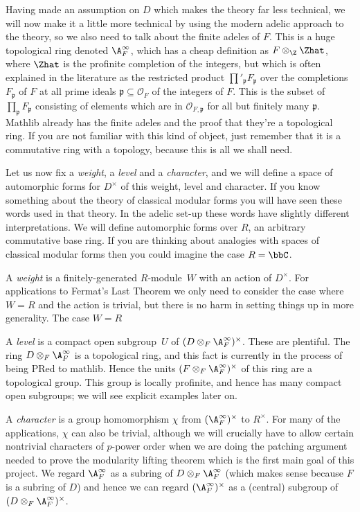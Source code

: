 Having made an assumption on $D$ which makes the theory far less technical, we will now
make it a little more technical by using the modern adelic approach to the theory,
so we also need to talk about the finite adeles of $F$. This is a huge topological ring
denoted $\A_F^\infty$, which has a cheap definition as $F\otimes_{\Z}\Zhat$, where $\Zhat$ is
the profinite completion of the integers, but which is often explained in the literature
as the restricted product $\prod'_{\mathfrak{p}}F_{\mathfrak{p}}$ over the completions
$F_{\mathfrak{p}}$ of $F$ at all prime ideals $\mathfrak{p}\subseteq\mathcal{O}_F$ of the
integers of $F$. This is the subset of $\prod_{\mathfrak{p}}F_{\mathfrak{p}}$ consisting
of elements which are in $\mathcal{O}_{F,\mathfrak{p}}$ for all but finitely many $\mathfrak{p}$.
Mathlib already has the finite adeles and the proof that they're a topological ring. If you are
not familiar with this kind of object, just remember that it is a commutative ring with a topology,
because this is all we shall need.

Let us now fix a \emph{weight}, a \emph{level} and a \emph{character}, and we will define
a space of automorphic forms for $D^\times$ of this weight, level and character. If you know something
about the theory of classical modular forms you will have seen these words used in that theory.
In the adelic set-up these words have slightly different interpretations. We will define automorphic
forms over $R$, an arbitrary commutative base ring. If you are thinking about analogies with
spaces of classical modular forms then you could imagine the case $R=\bbC$.

A \emph{weight} is a finitely-generated $R$-module~$W$ with an action of $D^\times$. For applications
to Fermat's Last Theorem we only need to consider the case where $W=R$ and the action is trivial,
but there is no harm in setting things up in more generality. The case $W=R$

A \emph{level} is a compact open subgroup~$U$ of $(D\otimes_F\A_F^\infty)^\times$. These are plentiful.
The ring $D\otimes_F\A_F^\infty$ is a topological ring, and this fact is currently in the process
of being PRed to mathlib. Hence the units $(F\otimes_F\A_F^\infty)^\times$ of this ring are a topological
group. This group is locally profinite, and hence has many compact open subgroups; we will see
explicit examples later on.

A \emph{character} is a group homomorphism $\chi$ from $(\A_F^\infty)^\times$ to $R^\times$. For many
of the applications, $\chi$ can also be trivial, although we will crucially have to allow
certain nontrivial characters of $p$-power order when we are doing the patching argument needed
to prove the modularity lifting theorem which is the first main goal of this project.
We regard $\A_F^\infty$ as a subring of $D\otimes_F\A_F^\infty$ (which makes sense because
$F$ is a subring of $D$) and hence we can regard $(\A_F^\infty)^\times$ as a (central)
subgroup of $(D\otimes_F\A_F^\infty)^\times$.

